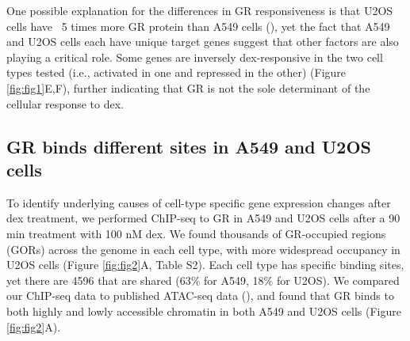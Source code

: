 \documentclass{article}
\begin{document}
{One possible explanation for the differences in GR responsiveness is that U2OS cells have ~5 times more GR protein than A549 cells (\cite{chen_incoherent_2013}), yet the fact that A549 and U2OS cells each have unique target genes suggest that other factors are also playing a critical role. Some genes are inversely dex-responsive in the two cell types tested (i.e., activated in one and repressed in the other) (Figure \ref{fig:fig1}E,F), further indicating that GR is not the sole determinant of the cellular response to dex. 

\subsection*{GR binds different sites in A549 and U2OS cells}

To identify underlying causes of cell-type specific gene expression changes after dex treatment, we performed ChIP-seq to GR in A549 and U2OS cells after a 90 min treatment with 100 nM dex. We found thousands of GR-occupied regions (GORs) across the genome in each cell type, with more widespread occupancy in U2OS cells (Figure \ref{fig:fig2}A, Table S2). Each cell type has specific binding sites, yet there are 4596 that are shared (63\% for A549, 18\% for U2OS). We compared our ChIP-seq data to published ATAC-seq data (\cite{encode_project_consortium_integrated_2012, davis_encyclopedia_2018, lee_different_2018}), and found that GR binds to both highly and lowly accessible chromatin in both A549 and U2OS cells (Figure \ref{fig:fig2}A).

}
\end{document}
